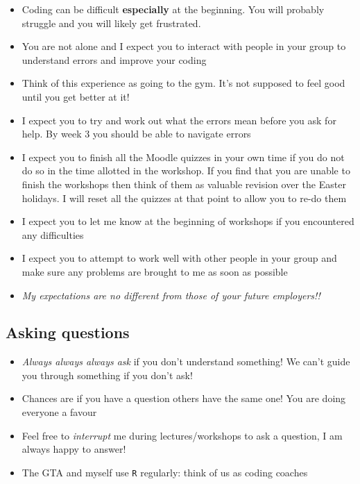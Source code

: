 \documentclass[
]{gitbook}
\providecommand{\tightlist}{%
  \setlength{\itemsep}{0pt}\setlength{\parskip}{0pt}}
\begin{document}
\begin{itemize}
\tightlist
\item
  Coding can be difficult \textbf{especially} at the beginning. You will probably struggle and you will likely get frustrated.
\item
  You are not alone and I expect you to interact with people in your group to understand errors and improve your coding
\item
  Think of this experience as going to the gym. It's not supposed to feel good until you get better at it!
\item
  I expect you to try and work out what the errors mean before you ask for help. By week 3 you should be able to navigate errors
\item
  I expect you to finish all the Moodle quizzes in your own time if you do not do so in the time allotted in the workshop. If you find that you are unable to finish the workshops then think of them as valuable revision over the Easter holidays. I will reset all the quizzes at that point to allow you to re-do them
\item
  I expect you to let me know at the beginning of workshops if you encountered any difficulties
\item
  I expect you to attempt to work well with other people in your group and make sure any problems are brought to me as soon as possible
\item
  \emph{My expectations are no different from those of your future employers!!}
\end{itemize}

\hypertarget{asking-questions}{%
\subsection{Asking questions}\label{asking-questions}}

\begin{itemize}
\tightlist
\item
  \emph{Always always always ask} if you don't understand something! We can't guide you through something if you don't ask!
\item
  Chances are if you have a question others have the same one! You are doing everyone a favour
\item
  Feel free to \emph{interrupt} me during lectures/workshops to ask a question, I am always happy to answer!
\item
  The GTA and myself use \texttt{R} regularly: think of us as coding coaches
\end{itemize}
\end{document}
